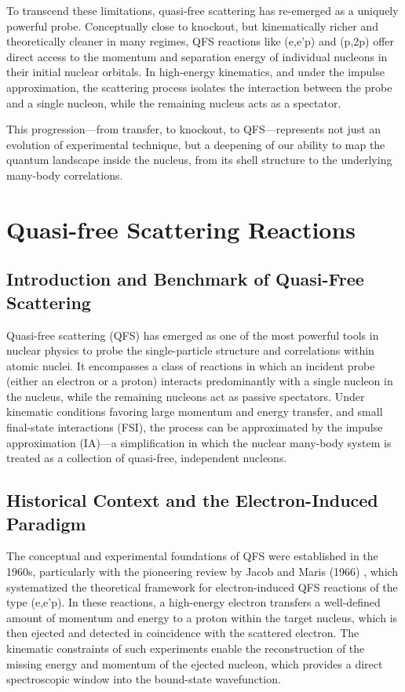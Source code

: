 To transcend these limitations, quasi-free scattering has re-emerged as a uniquely powerful probe. Conceptually close to knockout, but kinematically richer and theoretically cleaner in many regimes, QFS reactions like (e,e'p) and (p,2p) offer direct access to the momentum and separation energy of individual nucleons in their initial nuclear orbitals. In high-energy kinematics, and under the impulse approximation, the scattering process isolates the interaction between the probe and a single nucleon, while the remaining nucleus acts as a spectator.

This progression—from transfer, to knockout, to QFS—represents not just an evolution of experimental technique, but a deepening of our ability to map the quantum landscape inside the nucleus, from its shell structure to the underlying many-body correlations.


\section{Quasi-free Scattering Reactions}

\subsection{Introduction and Benchmark of Quasi-Free Scattering}

Quasi-free scattering (QFS) has emerged as one of the most powerful tools in nuclear physics to probe the single-particle structure and correlations within atomic nuclei. It encompasses a class of reactions in which an incident probe (either an electron or a proton) interacts predominantly with a single nucleon in the nucleus, while the remaining nucleons act as passive spectators. Under kinematic conditions favoring large momentum and energy transfer, and small final-state interactions (FSI), the process can be approximated by the impulse approximation (IA)—a simplification in which the nuclear many-body system is treated as a collection of quasi-free, independent nucleons.

\subsection{Historical Context and the Electron-Induced Paradigm}

The conceptual and experimental foundations of QFS were established in the 1960s, particularly with the pioneering review by Jacob and Maris (1966) \cite{jacob_quasi-free_1966}, which systematized the theoretical framework for electron-induced QFS reactions of the type (e,e'p). In these reactions, a high-energy electron transfers a well-defined amount of momentum and energy to a proton within the target nucleus, which is then ejected and detected in coincidence with the scattered electron. The kinematic constraints of such experiments enable the reconstruction of the missing energy and momentum of the ejected nucleon, which provides a direct spectroscopic window into the bound-state wavefunction.

